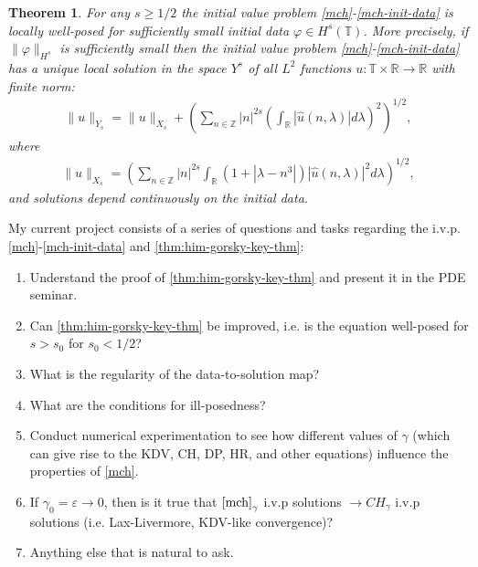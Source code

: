\documentclass[12pt,reqno]{amsart}
\newcommand{\rr}{\mathbb{R}}
\newcommand{\zz}{\mathbb{Z}}
\newcommand{\ci}{\mathbb{T}}
\newcommand{\ee}{\varepsilon}
\newcommand{\vp}{\varphi}
\theoremstyle{plain}  %
\newtheorem{theorem}{Theorem}
\begin{document}
\begin{theorem}
	\label{thm:him-gorsky-key-thm}
	For any $s \ge 1/2$ the initial value problem
	\eqref{mch}-\eqref{mch-init-data} is locally well-posed for
	sufficiently small initial data $\vp \in H^s(\ci)$. More precisely, if
	$\|\vp\|_{H^s}$ is sufficiently small then the initial value problem
	\eqref{mch}-\eqref{mch-init-data} has a unique local solution in the
	space $Y^s$ of all $L^2$ functions $u: \ci \times \rr \to \rr$ with
	finite norm:
%
%
\begin{equation}
	\label{soln-space-norm}
	\begin{split}
		\|u\|_{Y_s} = \|u\|_{X_s} + \left( \sum_{n \in \zz} |n|^{2s} \left(
		\int_\rr |\widehat{u}(n, \lambda)|d \lambda \right)^2 \right)^{1/2},
	\end{split}
\end{equation}
%
%
where
%
%
%
%
\begin{equation}
	\label{norm-piece}
	\begin{split}
		\|u\|_{X_s} = \left( \sum_{n \in \zz} |n|^{2s} \int_\rr (1 + |\lambda
		- n^3|) |\widehat{u}(n, \lambda) |^2 d \lambda \right)^{1/2},
	\end{split}
\end{equation}
%
%
and solutions depend continuously on the initial data.
%
%
\end{theorem}
%
%
%
My current project consists of a series of questions and tasks 
regarding the i.v.p.
\eqref{mch}-\eqref{mch-init-data} and \autoref{thm:him-gorsky-key-thm}:
%
%
\begin{enumerate}
	\item Understand the proof of \autoref{thm:him-gorsky-key-thm} and
		present it in the PDE seminar.
	\item Can \autoref{thm:him-gorsky-key-thm} be improved, i.e. is the
		equation well-posed for $s > s_0$ for $s_0 < 1/2$?
	\item What is the regularity of the data-to-solution map?
	\item What are the conditions for ill-posedness?
	\item Conduct numerical experimentation to see how different values of
		$\gamma$ (which can give rise to the KDV, CH, DP,  HR, and other
		equations) influence the properties of \eqref{mch}.
	\item If $\gamma_0 = \ee \to 0$, then is it true that
		$\eqref{mch}_\gamma$ i.v.p solutions $\to CH_\gamma$ i.v.p
		solutions (i.e. Lax-Livermore, KDV-like convergence)? 
	\item Anything else that is natural to ask.
\end{enumerate}








				  
\end{document}
